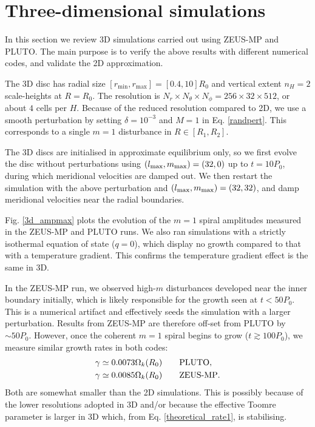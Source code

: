 \section{Three-dimensional simulations}\label{results3d}
In this section we review 3D simulations carried 
out using ZEUS-MP and PLUTO. The main purpose is to verify 
the above results with different numerical codes, and validate  
the 2D approximation.    

The 3D disc has radial size
$[r_\mathrm{min},r_\mathrm{max}]=[0.4,10]R_0$ and vertical extent  
$n_H=2$ scale-heights at $R=R_0$. The resolution is $N_r\times N_\theta\times
N_\phi=256\times32\times512$, or about $4$ cells per
$H$. Because of the reduced resolution 
compared to 2D, we use a smooth perturbation by setting
$\delta = 10^{-3}$ and $M=1$ in Eq. \ref{randpert}. This corresponds
to a single $m=1$ disturbance in $R\in[R_1,R_2]$.


The 3D discs are initialised in approximate equilibrium only, so we
first evolve the disc without perturbations using  
$(l_\mathrm{max},m_\mathrm{max})=(32,0)$ up to $t=10P_0$, during which 
meridional velocities are damped out. We then restart the simulation
with the above perturbation and $(l_\mathrm{max},m_\mathrm{max})=(32,32)$, and damp
meridional velocities near the radial boundaries. 

Fig. \ref{3d_ampmax} plots the evolution of the $m=1$ spiral amplitudes measured
in the ZEUS-MP and PLUTO runs. We also ran simulations
with a strictly isothermal equation of state ($q=0$), which display no
growth compared to that with a temperature gradient.  This confirms
the temperature gradient effect is the same in 3D. 


In the ZEUS-MP run, we observed high-$m$ disturbances developed near 
the inner boundary initially, which is likely responsible for the
growth seen at $t<50P_0$. This is a numerical artifact and effectively
seeds the simulation with a larger perturbation. Results
from ZEUS-MP are therefore off-set from PLUTO by $\sim50P_0$. However,
once the coherent $m=1$ spiral begins to grow ($t\gtrsim 100P_0$), 
we measure similar growth rates in both codes: 
\begin{align*}
  &\gamma \simeq 0.0073\Omega_k(R_0) \quad\quad \mathrm{PLUTO},\\
  &\gamma \simeq 0.0085\Omega_k(R_0) \quad\quad {\operatorname{ZEUS-MP}}.
\end{align*}
Both are somewhat smaller than the 2D simulations. This is
  possibly because of the lower resolutions adopted in 3D 
  and/or because the effective Toomre parameter is larger in 3D
  \citep{mamat10} which, from Eq. \ref{theoretical_rate1}, is
  stabilising. 

